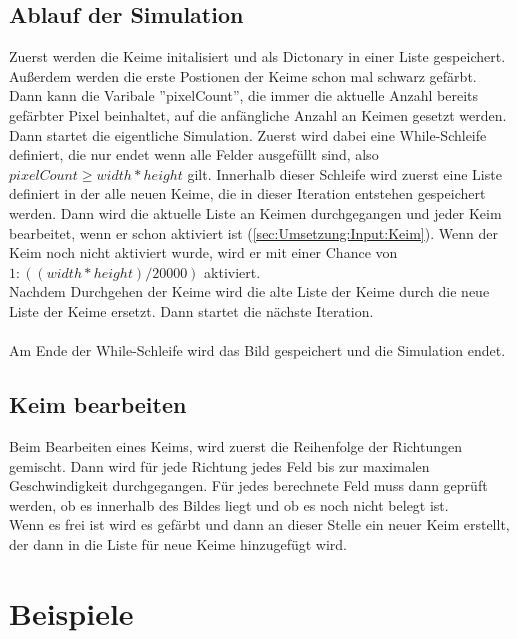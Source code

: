 \documentclass[a4paper,10pt,ngerman]{scrartcl}
\begin{document}
    \subsection{Ablauf der Simulation}
      Zuerst werden die Keime initalisiert und als Dictonary in einer Liste gespeichert. Außerdem werden die erste Postionen der Keime schon mal schwarz gefärbt. Dann kann die Varibale ''pixelCount'', die immer die aktuelle Anzahl bereits gefärbter Pixel beinhaltet, auf die anfängliche Anzahl an Keimen gesetzt werden.\\
      Dann startet die eigentliche Simulation. Zuerst wird dabei eine While-Schleife definiert, die nur endet wenn alle Felder ausgefüllt sind, also $pixelCount \geq width*height$ gilt. Innerhalb dieser Schleife wird zuerst eine Liste definiert in der alle neuen Keime, die in dieser Iteration entstehen gespeichert werden. Dann wird die aktuelle Liste an Keimen durchgegangen und jeder Keim bearbeitet, wenn er schon aktiviert ist (\cref{sec:Umsetzung:Input:Keim}). Wenn der Keim noch nicht aktiviert wurde, wird er mit einer Chance von $1:((width*height)/20000)$ aktiviert.\\
      Nachdem Durchgehen der Keime wird die alte Liste der Keime durch die neue Liste der Keime ersetzt. Dann startet die nächste Iteration.\\\\
      Am Ende der While-Schleife wird das Bild gespeichert und die Simulation endet.
    \subsection{Keim bearbeiten\label{sec:Umsetzung:Input:Keim}}
      Beim Bearbeiten eines Keims, wird zuerst die Reihenfolge der Richtungen gemischt. Dann wird für jede Richtung jedes Feld bis zur maximalen Geschwindigkeit durchgegangen. Für jedes berechnete Feld muss dann geprüft werden, ob es innerhalb des Bildes liegt und ob es noch nicht belegt ist.\\
      Wenn es frei ist wird es gefärbt und dann an dieser Stelle ein neuer Keim erstellt, der dann in die Liste für neue Keime hinzugefügt wird.
  \section{Beispiele}
\end{document}
